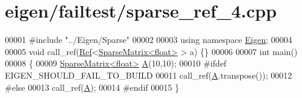 \hypertarget{eigen_2failtest_2sparse__ref__4_8cpp_source}{}\section{eigen/failtest/sparse\+\_\+ref\+\_\+4.cpp}
\label{eigen_2failtest_2sparse__ref__4_8cpp_source}

\begin{DoxyCode}
00001 \textcolor{preprocessor}{#include "../Eigen/Sparse"}
00002 
00003 \textcolor{keyword}{using namespace }\hyperlink{namespace_eigen}{Eigen};
00004 
00005 \textcolor{keywordtype}{void} call\_ref(\hyperlink{group___core___module_class_eigen_1_1_ref}{Ref}<\hyperlink{group___sparse_core___module_class_eigen_1_1_sparse_matrix}{SparseMatrix<float>} > a) \{\}
00006 
00007 \textcolor{keywordtype}{int} main()
00008 \{
00009   \hyperlink{group___sparse_core___module_class_eigen_1_1_sparse_matrix}{SparseMatrix<float>} \hyperlink{group___core___module_class_eigen_1_1_matrix}{A}(10,10);
00010 \textcolor{preprocessor}{#ifdef EIGEN\_SHOULD\_FAIL\_TO\_BUILD}
00011   call\_ref(\hyperlink{group___core___module_class_eigen_1_1_matrix}{A}.transpose());
00012 \textcolor{preprocessor}{#else}
00013   call\_ref(\hyperlink{group___core___module_class_eigen_1_1_matrix}{A});
00014 \textcolor{preprocessor}{#endif}
00015 \}
\end{DoxyCode}

